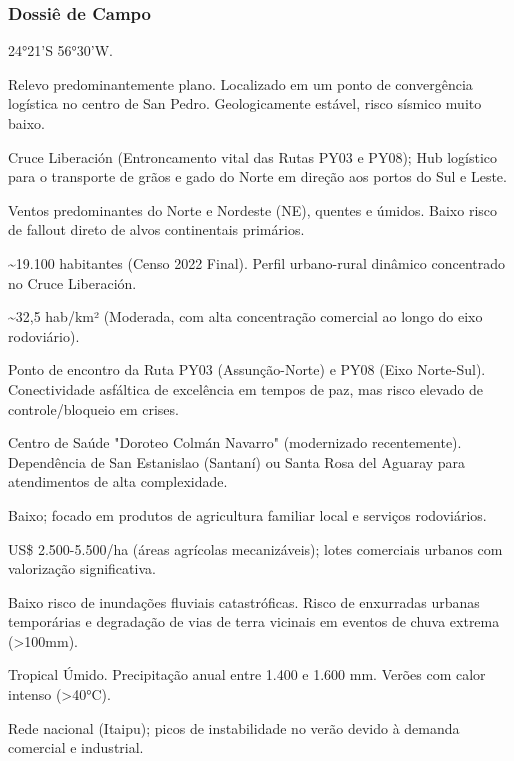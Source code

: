 \subsubsection{Dossiê de Campo}
\begin{description}[style=nextline,leftmargin=0.5cm,font=\bfseries]
\item[Coordenadas]  24°21'S 56°30'W.
\item[Topografia]  Relevo predominantemente plano. Localizado em um ponto de convergência logística no centro de San Pedro. Geologicamente estável, risco sísmico muito baixo.
\item[Alvos Estratégicos]  Cruce Liberación (Entroncamento vital das Rutas PY03 e PY08); Hub logístico para o transporte de grãos e gado do Norte em direção aos portos do Sul e Leste.
\item[Fallout]  Ventos predominantes do Norte e Nordeste (NE), quentes e úmidos. Baixo risco de fallout direto de alvos continentais primários.
\item[População]  \textasciitilde 19.100 habitantes (Censo 2022 Final). Perfil urbano-rural dinâmico concentrado no Cruce Liberación.
\item[Densidade]  \textasciitilde 32,5 hab/\allowbreak km² (Moderada, com alta concentração comercial ao longo do eixo rodoviário).
\item[Vias de Acesso]  Ponto de encontro da Ruta PY03 (Assunção-Norte) e PY08 (Eixo Norte-Sul). Conectividade asfáltica de excelência em tempos de paz, mas risco elevado de controle/\allowbreak bloqueio em crises.
\item[Serviços]  Centro de Saúde "Doroteo Colmán Navarro" (modernizado recentemente). Dependência de San Estanislao (Santaní) ou Santa Rosa del Aguaray para atendimentos de alta complexidade.
\item[Custo de Vida]  Baixo; focado em produtos de agricultura familiar local e serviços rodoviários.
\item[Preço da Terra]  US\$ 2.500-5.500/\allowbreak ha (áreas agrícolas mecanizáveis); lotes comerciais urbanos com valorização significativa.
\item[Hidrologia]  Baixo risco de inundações fluviais catastróficas. Risco de enxurradas urbanas temporárias e degradação de vias de terra vicinais em eventos de chuva extrema (>100mm).
\item[Clima]  Tropical Úmido. Precipitação anual entre 1.400 e 1.600 mm. Verões com calor intenso (>40°C).
\item[Energia]  Rede nacional (Itaipu); picos de instabilidade no verão devido à demanda comercial e industrial.

\end{description}
